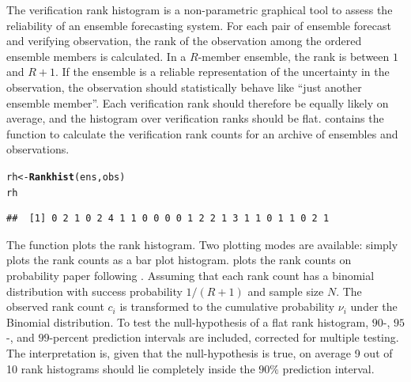 \documentclass[article]{jss}\usepackage{graphicx, color}
\makeatletter
\newcommand{\hlfunctioncall}[1]{\textcolor[rgb]{0,0.501960784313725,0.752941176470588}{\textbf{#1}}}%
\newenvironment{kframe}{%
 \def\at@end@of@kframe{}%
 \ifinner\ifhmode%
  \def\at@end@of@kframe{\end{minipage}}%
  \begin{minipage}{\columnwidth}%
 \fi\fi%
 \def\FrameCommand##1{\hskip\@totalleftmargin \hskip-\fboxsep
 \colorbox{shadecolor}{##1}\hskip-\fboxsep
     \hskip-\linewidth \hskip-\@totalleftmargin \hskip\columnwidth}%
 \MakeFramed {\advance\hsize-\width
   \@totalleftmargin\z@ \linewidth\hsize
   \@setminipage}}%
 {\par\unskip\endMakeFramed%
 \at@end@of@kframe}
\newenvironment{knitrout}{}{} %
\makeatother
\begin{document}
The verification rank histogram \citep{hamill2001interpretation} is a non-parametric graphical tool to assess the reliability of an ensemble forecasting system.
For each pair of ensemble forecast and verifying observation, the rank of the observation among the ordered ensemble members is calculated.
In a $R$-member ensemble, the rank is between $1$ and $R+1$.
If the ensemble is a reliable representation of the uncertainty in the observation, the observation should statistically behave like ``just another ensemble member''. 
Each verification rank should therefore be equally likely on average, and the histogram over verification ranks should be flat. 
 contains the function  to calculate the verification rank counts for an archive of ensembles and observations.

\begin{knitrout}
\color{fgcolor}\begin{kframe}
\begin{alltt}
rh <- \hlfunctioncall{Rankhist}(ens, obs)
rh
\end{alltt}
\begin{verbatim}
##  [1] 0 2 1 0 2 4 1 1 0 0 0 0 1 2 2 1 3 1 1 0 1 1 0 2 1
\end{verbatim}
\end{kframe}
\end{knitrout}




The function  plots the rank histogram.
Two plotting modes are available:
 simply plots the rank counts as a bar plot histogram.
 plots the rank counts on probability paper following \citet{broecker2008reliability}. 
Assuming that each rank count has a binomial distribution with success probability $1/(R+1)$ and sample size $N$.
The observed rank count $c_i$ is transformed to the cumulative probability $\nu_i$ under the Binomial distribution.
To test the null-hypothesis of a flat rank histogram, $90$-, $95$-, and $99$-percent prediction intervals are included, corrected for multiple testing.
The interpretation is, given that the null-hypothesis is true, on average 9 out of 10 rank histograms should lie completely inside the $90\%$ prediction interval.
\end{document}
